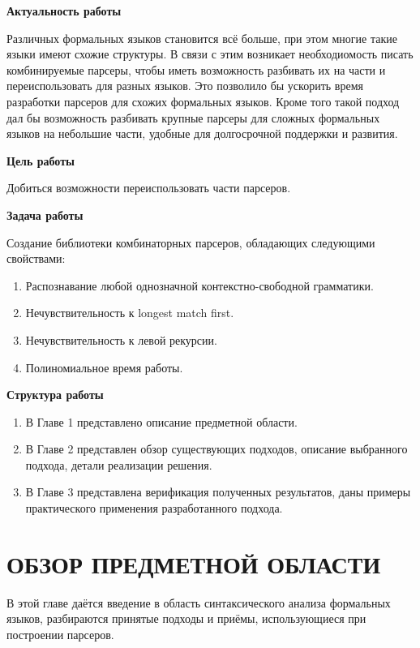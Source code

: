 \documentclass[times]{itmo-student-thesis}
\begin{document}
\tableofcontents

\startprefacepage
\textbf{Актуальность работы}

Различных формальных языков становится всё больше, при этом многие такие языки имеют схожие структуры. В связи с этим
возникает необходиомость писать комбинируемые парсеры, чтобы иметь возможность разбивать их на части и переиспользовать для
разных языков. Это позволило бы ускорить время разработки парсеров для схожих формальных языков. Кроме того такой
подход дал бы возможность разбивать крупные парсеры для сложных формальных языков на небольшие части, удобные для
долгосрочной поддержки и развития.

\textbf{Цель работы}

Добиться возможности переиспользовать части парсеров.

\textbf{Задача работы}

Создание библиотеки комбинаторных парсеров, обладающих следующими свойствами:

\begin{enumerate}
    \item Распознавание любой однозначной контекстно-свободной грамматики.
    \item Нечувствительность к longest match first.
    \item Нечувствительность к левой рекурсии.
    \item Полиномиальное время работы.
\end{enumerate}

\textbf{Структура работы}

\begin{enumerate}
    \item В Главе 1 представлено описание предметной области.
    \item В Главе 2 представлен обзор существующих подходов, описание выбранного подхода, детали реализации решения.
    \item В Главе 3 представлена верификация полученных результатов, даны примеры практического применения 
    разработанного подхода.
\end{enumerate}

\chapter{ОБЗОР ПРЕДМЕТНОЙ ОБЛАСТИ}

В этой главе даётся введение в область синтаксического анализа формальных языков, разбираются принятые подходы и приёмы, 
использующиеся при построении парсеров.
\end{document}

